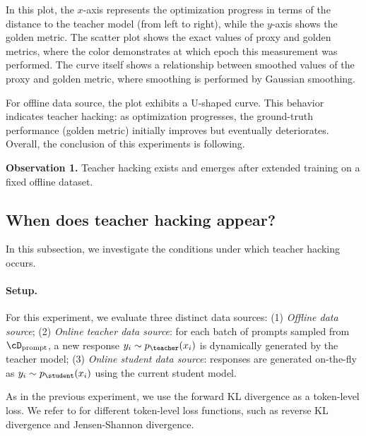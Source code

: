 In this plot, the $x$-axis represents the optimization progress in terms of the distance to the teacher model (from left to right), while the $y$-axis shows the golden metric. The scatter plot shows the exact values of proxy and golden metrics, where the color demonstrates at which epoch this measurement was performed. The curve itself shows a relationship between smoothed values of the proxy and golden metric, where smoothing is performed by Gaussian smoothing.

For offline data source, the plot exhibits a U-shaped curve. This behavior indicates teacher hacking: as optimization progresses, the ground-truth performance (golden metric) initially improves but eventually deteriorates. Overall, the conclusion of this experiments is following.

\begin{tcolorbox}[colback=colorblue,
    colframe=black,
    arc=4pt,
    boxsep=0.3pt,
]%
\textbf{Observation 1.} Teacher hacking exists and emerges after extended training on a fixed offline dataset.%
\end{tcolorbox}







\subsection{When does teacher hacking appear?}
In this subsection, we investigate the conditions under which teacher hacking occurs.



\paragraph{Setup.}

For this experiment, we evaluate three distinct data sources: (1) \textit{Offline data source};
(2) \textit{Online teacher data source}: for each batch of prompts sampled from $\cD_{\mathrm{prompt}}$, a new response $y_i \sim p_{\teacher}(x_i)$ is dynamically generated by the teacher model;
(3) \textit{Online student data source}: responses are generated on-the-fly as $y_i \sim p_{\student}(x_i)$ using the current student model.

As in the previous experiment, we use the forward KL divergence as a token-level loss. We refer to  for different token-level loss functions, such as reverse KL divergence and Jensen-Shannon divergence.

